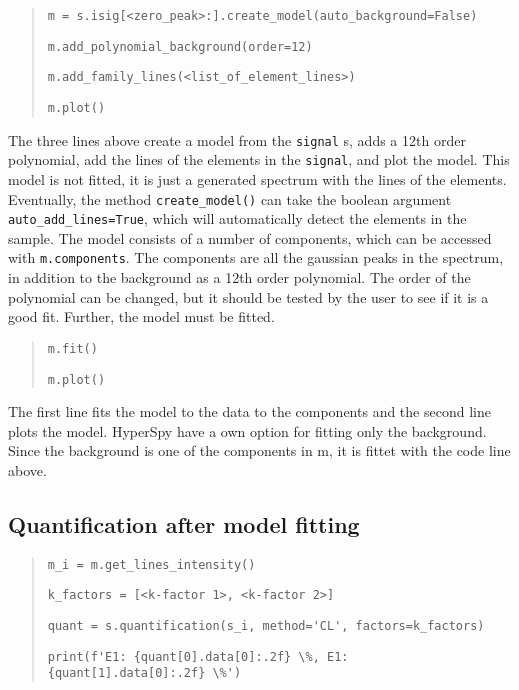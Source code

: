 \begin{quote}
    \verb|m = s.isig[<zero_peak>:].create_model(auto_background=False)|

    \verb|m.add_polynomial_background(order=12)|

    \verb|m.add_family_lines(<list_of_element_lines>)|

    \verb|m.plot()|

\end{quote}

The three lines above create a model from the \verb|signal| s, adds a 12th order polynomial, add the lines of the elements in the \verb|signal|, and plot the model.
This model is not fitted, it is just a generated spectrum with the lines of the elements.
Eventually, the method \verb|create_model()| can take the boolean argument \verb|auto_add_lines=True|, which will automatically detect the elements in the sample.
The model consists of a number of components, which can be accessed with \verb|m.components|.
The components are all the gaussian peaks in the spectrum, in addition to the background as a 12th order polynomial.
The order of the polynomial can be changed, but it should be tested by the user to see if it is a good fit.
Further, the model must be fitted.

\begin{quote}
    \verb|m.fit()|


    \verb|m.plot()|
\end{quote}

The first line fits the model to the data to the components and the second line plots the model.
HyperSpy have a own option for fitting only the background.
Since the background is one of the components in m, it is fittet with the code line above.


\subsection{Quantification after model fitting}
\label{sec:results:steps:quantification:model}

\begin{quote}
    \verb|m_i = m.get_lines_intensity()|

    \verb|k_factors = [<k-factor 1>, <k-factor 2>] |

    \verb|quant = s.quantification(s_i, method='CL', factors=k_factors)|

    \verb|print(f'E1: {quant[0].data[0]:.2f} \%, E1: {quant[1].data[0]:.2f} \%')|

\end{quote}

